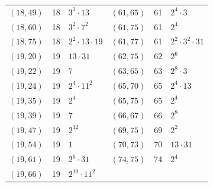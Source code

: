 \documentclass[11pt]{article}
\begin{document}
\begin{longtable}{@{}lrl@{\qquad}lrl@{}}
$(18,49)$ & 18 & $3^{3}\cdot 13$ & $(61,65)$ & 61 & $2^{4}\cdot 3$\\
$(18,60)$ & 18 & $3^{2}\cdot 7^{2}$ & $(61,75)$ & 61 & $2^{4}$\\
$(18,75)$ & 18 & $2^{2}\cdot 13\cdot 19$ & $(61,77)$ & 61 & $2^{2}\cdot 3^{2}\cdot 31$\\
$(19,20)$ & 19 & $13\cdot 31$ & $(62,75)$ & 62 & $2^{6}$\\
$(19,22)$ & 19 & $7$ & $(63,65)$ & 63 & $2^{8}\cdot 3$\\
$(19,24)$ & 19 & $2^{4}\cdot 11^{2}$ & $(65,70)$ & 65 & $2^{4}\cdot 13$\\
$(19,35)$ & 19 & $2^{4}$ & $(65,75)$ & 65 & $2^{4}$\\
$(19,39)$ & 19 & $7$ & $(66,67)$ & 66 & $2^{8}$\\
$(19,47)$ & 19 & $2^{12}$ & $(69,75)$ & 69 & $2^{2}$\\
$(19,54)$ & 19 & $1$ & $(70,73)$ & 70 & $13\cdot 31$\\
$(19,61)$ & 19 & $2^{6}\cdot 31$ & $(74,75)$ & 74 & $2^{4}$\\
$(19,66)$ & 19 & $2^{10}\cdot 11^{2}$ & & &\\
\end{longtable}
\endgroup
\end{document}
